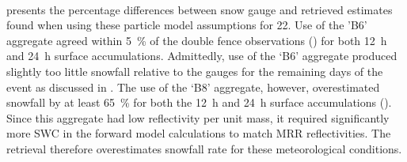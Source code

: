 %
\noindent
\\
 presents the percentage differences between snow gauge and retrieved estimates found when using these particle model assumptions for \SI{22}{\dec}. Use of the 'B6' aggregate agreed within \SI{5}{\percent} of the double fence observations () for both \SI{12}{\hour} and \SI{24}{\hour} surface accumulations. Admittedly, use of the ‘B6’ aggregate produced slightly too little snowfall relative to the gauges for the remaining days of the event as discussed in . The use of the ‘B8’ aggregate, however, overestimated snowfall by at least \SI{65}{\percent} for both the \SI{12}{\hour} and \SI{24}{\hour} surface accumulations (). Since this aggregate had low reflectivity per unit mass, it required significantly more SWC in the forward model calculations to match MRR reflectivities. The retrieval therefore overestimates snowfall rate for these meteorological conditions.
